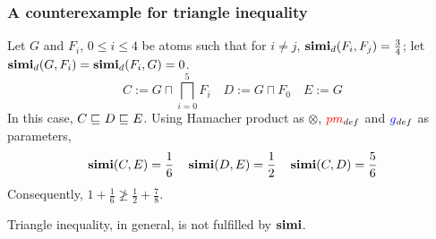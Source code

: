 \documentclass[smaller, dvipsnames]{beamer}
\begin{document}
\begin{frame}
  \frametitle{A counterexample for triangle inequality}
  Let \(G\) and \(F_i\), \(0 \le i \le 4\) be atoms such that for \(i \ne j\), \(\operatorname{\mathbf{simi}}_d(F_i,F_j) = \tfrac34\);
  let \(\operatorname{\mathbf{simi}}_d(G,F_i) = \operatorname{\mathbf{simi}}_d(F_i,G) = 0\).
  \begin{equation*}
    C := G \sqcap \bigsqcap_{i=0}^5F_i
    \quad
    D := G \sqcap F_0
    \quad
    E := G
  \end{equation*}
  In this case, \(C \sqsubseteq_{\mathcal{}} D \sqsubseteq_{\mathcal{}} E\).
  Using Hamacher product as \(\otimes\), \(\textcolor{red}{pm}_{def}\) and \(\textcolor{blue}{g}_{def}\) as parameters,
  \begin{equation*}
    \operatorname{\mathbf{simi}}(C,E) = \frac{1}{6} \quad
    \operatorname{\mathbf{simi}}(D,E) = \frac{1}{2} \quad
    \operatorname{\mathbf{simi}}(C,D) = \frac{5}{6}
  \end{equation*}
  Consequently, \(1 + \tfrac16 \not\ge \tfrac12 + \tfrac78\).

  Triangle inequality, in general, is not fulfilled by \(\operatorname{\mathbf{simi}}\).
\end{frame}
\end{document}
